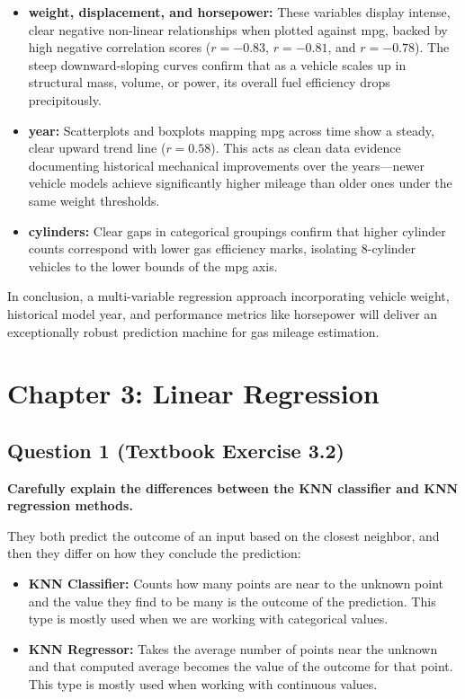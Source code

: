 \documentclass[12pt,a4paper]{article}
\begin{document}
\begin{itemize}
    \item \textbf{weight, displacement, and horsepower:} These variables display intense, clear negative non-linear relationships when plotted against mpg, backed by high negative correlation scores ($r=-0.83$, $r=-0.81$, and $r=-0.78$). The steep downward-sloping curves confirm that as a vehicle scales up in structural mass, volume, or power, its overall fuel efficiency drops precipitously.
    \item \textbf{year:} Scatterplots and boxplots mapping mpg across time show a steady, clear upward trend line ($r=0.58$). This acts as clean data evidence documenting historical mechanical improvements over the years---newer vehicle models achieve significantly higher mileage than older ones under the same weight thresholds.
    \item \textbf{cylinders:} Clear gaps in categorical groupings confirm that higher cylinder counts correspond with lower gas efficiency marks, isolating 8-cylinder vehicles to the lower bounds of the mpg axis.
\end{itemize}

In conclusion, a multi-variable regression approach incorporating vehicle weight, historical model year, and performance metrics like horsepower will deliver an exceptionally robust prediction machine for gas mileage estimation.

\newpage
\section*{Chapter 3: Linear Regression}

\subsection*{Question 1 (Textbook Exercise 3.2)}

\textbf{Carefully explain the differences between the KNN classifier and KNN regression methods.}

They both predict the outcome of an input based on the closest neighbor, and then they differ on how they conclude the prediction:

\begin{itemize}
    \item \textbf{KNN Classifier:} Counts how many points are near to the unknown point and the value they find to be many is the outcome of the prediction. This type is mostly used when we are working with categorical values.
    \item \textbf{KNN Regressor:} Takes the average number of points near the unknown and that computed average becomes the value of the outcome for that point. This type is mostly used when working with continuous values.
\end{itemize}
\end{document}
